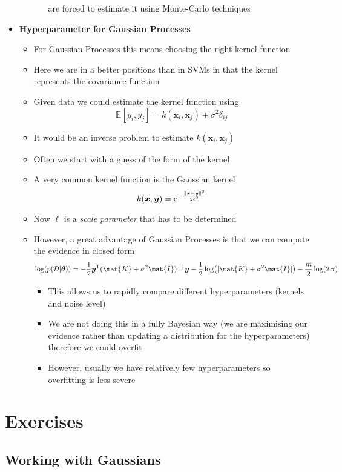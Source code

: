 \documentclass[11pt]{article}
\newcommand{\tr}{\textsf{T}}
\newcommand{\av}[2][]{\mathbb{E}_{#1\!}\left[ #2 \right]}
\newcommand{\logg}[1]{\log\!\left( #1 \right)}
\newcommand{\e}[1]{{\rm e}^{#1}}
\begin{document}
\begin{itemize}
\begin{itemize}
\begin{itemize}
are forced to estimate it using Monte-Carlo techniques
\end{itemize}
\end{itemize}
\item \textbf{Hyperparameter for Gaussian Processes}
\begin{itemize}
\item For Gaussian Processes this means choosing the right kernel function
\item Here we are in a better positions than in SVMs in that the kernel
represents the covariance function
\item Given data we could estimate the kernel function using
$$ \av{y_i,y_j} = k(\bm{x}_i,\bm{x}_j) + \sigma^2 \delta_{ij} $$
\item It would be an inverse problem to estimate \(k(\bm{x}_i,\bm{x}_j)\)
\item Often we start with a guess of the form of the kernel
\item A very common kernel function is the Gaussian kernel
$$ k(\bm{x},\bm{y}) = \e{-\frac{\|\bm{x}-\bm{y}\|^2}{2\ell^2}} $$
\item Now \(\ell\) is a \emph{scale parameter} that has to be determined
\item However, a great advantage of Gaussian Processes is that we can
compute the evidence in closed form
$$  \logg{p(\mathcal{D}|\bm{\theta})} = - \frac{1}{2} \bm{y}^\tr (\mat{K}+\sigma^2\mat{I})^{-1} \bm{y} - \frac{1}{2}  \logg{|\mat{K}+\sigma^2\mat{I}|} - \frac{m}{2} \log(2\,\pi) $$
\begin{itemize}
\item This allows us to rapidly compare different hyperparameters
(kernels and noise level)
\item We are not doing this in a fully Bayesian way (we are
maximising our evidence rather than updating a distribution
for the hyperparameters) therefore we could overfit
\item However, usually we have relatively few hyperparameters so
overfitting is less severe
\end{itemize}
\end{itemize}
\end{itemize}

\section{Exercises}
\label{sec:orgce5ccd2}

\subsection{Working with Gaussians}
\label{sec:org3f4f6e5}
\end{document}
